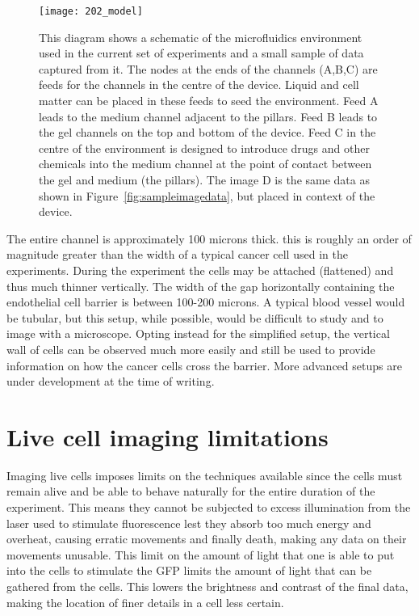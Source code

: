 \begin{figure}[h!]
 \centering
 \texttt{[image: 202\_model]}
 \caption[Microfludics device and data in context]{
 	This diagram shows a schematic of the microfluidics environment used in the current set of experiments and a small sample of data captured from it. The nodes at the ends of the channels (A,B,C) are feeds for the channels in the centre of the device. Liquid and cell matter can be placed in these feeds to seed the environment. Feed A leads to the medium channel adjacent to the pillars. Feed B leads to the gel channels on the top and bottom of the device. Feed C in the centre of the environment is designed to introduce drugs and other chemicals into the medium channel at the point of contact between the gel and medium (the pillars). The image D is the same data as shown in Figure~\ref{fig:sampleimagedata}, but placed in context of the device.
 }
 \label{fig:model}
\end{figure}

The entire channel is approximately 100 microns thick. this is roughly an order of magnitude greater than the width of a typical cancer cell used in the experiments. During the experiment the cells may be attached (flattened) and thus much thinner vertically. The width of the gap horizontally containing the endothelial cell barrier is between 100-200 microns. A typical blood vessel would be tubular, but this setup, while possible, would be difficult to study and to image with a microscope. Opting instead for the simplified setup, the vertical wall of cells can be observed much more easily and still be used to provide information on how the cancer cells cross the barrier. More advanced setups are under development at the time of writing.

\section{Live cell imaging limitations}

Imaging live cells imposes limits on the techniques available since the cells must remain alive and be able to behave naturally for the entire duration of the experiment. This means they cannot be subjected to excess illumination from the laser used to stimulate fluorescence lest they absorb too much energy and overheat, causing erratic movements and finally death, making any data on their movements unusable. This limit on the amount of light that one is able to put into the cells to stimulate the GFP limits the amount of light that can be gathered from the cells. This lowers the brightness and contrast of the final data, making the location of finer details in a cell less certain.

